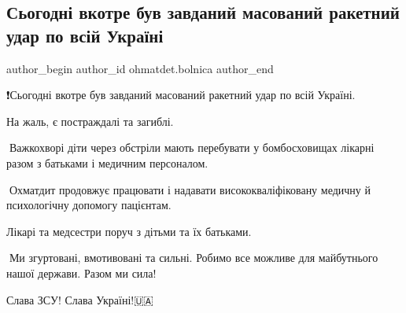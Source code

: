  
 
 
 
 
 
\subsection{Сьогодні вкотре був завданий масований ракетний удар по всій Україні}
\label{sec:10_10_2022.fb.ohmatdet.bolnica.1.raket_udar}
 
\ifcmt
 author_begin
   author_id ohmatdet.bolnica
 author_end
\fi

❗️Сьогодні вкотре був завданий масований ракетний удар по всій Україні.

На жаль, є постраждалі та загиблі.

🔻Важкохворі діти через обстріли мають перебувати у бомбосховищах лікарні разом
з батьками і медичним персоналом. 

🔻Охматдит продовжує працювати і надавати висококваліфіковану медичну й
психологічну допомогу пацієнтам.

Лікарі та медсестри поруч з дітьми та їх батьками.

🔻Ми згуртовані, вмотивовані та сильні. Робимо все можливе для майбутнього
нашої держави. Разом ми сила!

Слава ЗСУ! Слава Україні!🇺🇦

